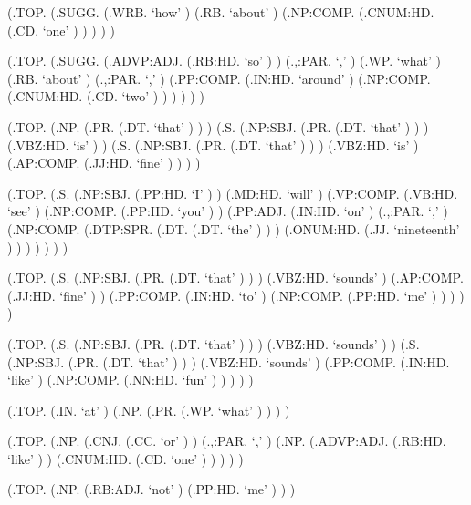 \documentclass[10pt]{article}
\begin{document}
\begin{parsetree}  (.TOP. (.SUGG. (.WRB. `how' ) (.RB. `about' ) (.NP:COMP. (.CNUM:HD. (.CD. `one' ) ) ) ) ) \end{parsetree}

\begin{parsetree}  (.TOP. (.SUGG. (.ADVP:ADJ. (.RB:HD. `so' ) ) (.,:PAR. `,' ) (.WP. `what' ) (.RB. `about' ) (.,:PAR. `,' ) (.PP:COMP. (.IN:HD. `around' ) (.NP:COMP. (.CNUM:HD. (.CD. `two' ) ) ) ) ) ) \end{parsetree}

\begin{parsetree}  (.TOP. (.NP. (.PR. (.DT. `that' ) ) ) (.S. (.NP:SBJ. (.PR. (.DT. `that' ) ) ) (.VBZ:HD. `is' ) ) (.S. (.NP:SBJ. (.PR. (.DT. `that' ) ) ) (.VBZ:HD. `is' ) (.AP:COMP. (.JJ:HD. `fine' ) ) ) ) \end{parsetree}

\begin{parsetree}  (.TOP. (.S. (.NP:SBJ. (.PP:HD. `I' ) ) (.MD:HD. `will' ) (.VP:COMP. (.VB:HD. `see' ) (.NP:COMP. (.PP:HD. `you' ) ) (.PP:ADJ. (.IN:HD. `on' ) (.,:PAR. `,' ) (.NP:COMP. (.DTP:SPR. (.DT. (.DT. `the' ) ) ) (.ONUM:HD. (.JJ. `nineteenth' ) ) ) ) ) ) ) \end{parsetree}

\begin{parsetree}  (.TOP. (.S. (.NP:SBJ. (.PR. (.DT. `that' ) ) ) (.VBZ:HD. `sounds' ) (.AP:COMP. (.JJ:HD. `fine' ) ) (.PP:COMP. (.IN:HD. `to' ) (.NP:COMP. (.PP:HD. `me' ) ) ) ) ) \end{parsetree}

\begin{parsetree}  (.TOP. (.S. (.NP:SBJ. (.PR. (.DT. `that' ) ) ) (.VBZ:HD. `sounds' ) ) (.S. (.NP:SBJ. (.PR. (.DT. `that' ) ) ) (.VBZ:HD. `sounds' ) (.PP:COMP. (.IN:HD. `like' ) (.NP:COMP. (.NN:HD. `fun' ) ) ) ) ) \end{parsetree}

\begin{parsetree}  (.TOP. (.IN. `at' ) (.NP. (.PR. (.WP. `what' ) ) ) ) \end{parsetree}

\begin{parsetree}  (.TOP. (.NP. (.CNJ. (.CC. `or' ) ) (.,:PAR. `,' ) (.NP. (.ADVP:ADJ. (.RB:HD. `like' ) ) (.CNUM:HD. (.CD. `one' ) ) ) ) ) \end{parsetree}

\begin{parsetree}  (.TOP. (.NP. (.RB:ADJ. `not' ) (.PP:HD. `me' ) ) ) \end{parsetree}
\end{document}
